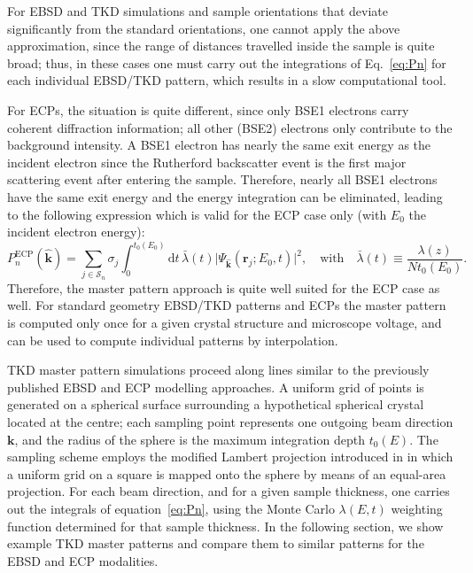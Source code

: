 For EBSD and TKD simulations and sample orientations that deviate significantly from the standard orientations, one cannot apply the above approximation, since the range of distances travelled inside the sample is quite broad; thus, in these cases one must carry out the integrations of Eq.~\ref{eq:Pn} for each individual EBSD/TKD pattern, which results in a slow computational tool.

For ECPs, the situation is quite different, since only BSE1 electrons carry coherent diffraction information; all other (BSE2) electrons only contribute to the background intensity.  A BSE1 electron has nearly the same exit energy as the incident electron since the Rutherford backscatter event is the first major scattering event after entering the sample.  Therefore, nearly all BSE1 electrons have the same exit energy and the energy integration can be eliminated, leading to the following expression which is valid for the ECP case only (with $E_0$ the incident electron energy):
\begin{equation}
    P_n^{\text{ECP}}(\hat{\mathbf{k}}) = \sum_{j\in \mathcal{S}_n}\sigma_j
    \int_0^{t_0(E_0)}\!\!\!\!\!\!\mathrm{d}t\, \bar{\lambda}(t)\vert\Psi_{\hat{\mathbf{k}}}(\mathbf{r}_j;E_0,t)\vert^2,\quad\text{with}\quad  \bar{\lambda}(t) \equiv \frac{\lambda(z)}{N t_0(E_0)}.\label{eq:PnECP}
\end{equation}
Therefore, the master pattern approach is quite well suited for the ECP case as well. For standard geometry EBSD/TKD patterns and ECPs the master pattern is computed only once for a given crystal structure and microscope voltage, and can be used to compute individual patterns by interpolation.  

TKD master pattern simulations proceed along lines similar to the previously published EBSD \cite{degraef2013e} and ECP \cite{degraef2017k} modelling approaches. A uniform grid of points is generated on a spherical surface surrounding a hypothetical spherical crystal located at the centre; each sampling point represents one outgoing beam direction $\mathbf{k}$, and the radius of the sphere is the maximum integration depth $t_0(E)$.  The sampling scheme employs the modified Lambert projection introduced in
\cite{rosca2010a, degraef2013e} in which a uniform grid on a square is mapped onto the sphere by means of an
equal-area projection. For each beam direction, and for a given sample thickness, one carries out the
integrals of equation~\ref{eq:Pn}, using the Monte Carlo $\lambda(E,t)$ weighting function determined for that sample thickness.  In the following section, we show example TKD master patterns and compare them to similar patterns for the EBSD and ECP modalities.



